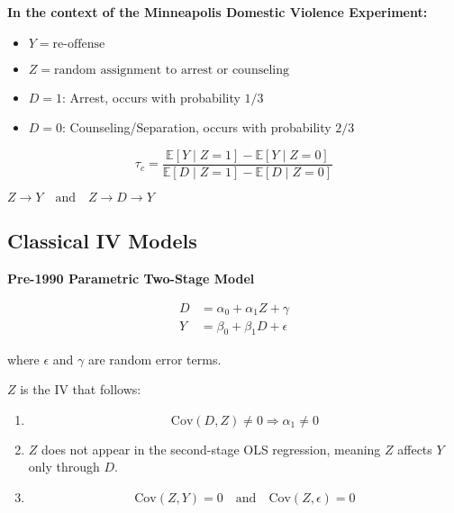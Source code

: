 \bigskip

\textbf{In the context of the Minneapolis Domestic Violence Experiment:}
\begin{itemize}
    \item \(Y = \text{re-offense}\)
    \item \(Z = \text{random assignment to arrest or counseling}\)
    \item \(D = 1\): Arrest, occurs with probability \(1/3\)
    \item \(D = 0\): Counseling/Separation, occurs with probability \(2/3\)
\end{itemize}

\[
\tau_c = \frac{\mathbb{E}[Y \mid Z = 1] - \mathbb{E}[Y \mid Z = 0]}{\mathbb{E}[D \mid Z = 1] - \mathbb{E}[D \mid Z = 0]}
\]


 $Z \to Y \quad \text{and} \quad Z \to D \to Y$

\subsection{Classical IV Models}

\textbf{Pre-1990 Parametric Two-Stage Model}

\begin{align*}
    D &= \alpha_0 + \alpha_1 Z + \gamma \tag{A} \\
    Y &= \beta_0 + \beta_1 D + \epsilon \tag{A}
\end{align*}

where \(\epsilon\) and \(\gamma\) are random error terms.

\(Z\) is the IV that follows:
\begin{enumerate}
    \item {} 
    \[
    \text{Cov}(D, Z) \neq 0 \Rightarrow \alpha_1 \neq 0
    \]
    \item {} \(Z\) does not appear in the second-stage OLS regression, meaning \(Z\) affects \(Y\) only through \(D\).

    \item {} 
    \[
    \text{Cov}(Z, Y) = 0 \quad \text{and} \quad \text{Cov}(Z, \epsilon) = 0
    \]
\end{enumerate}

